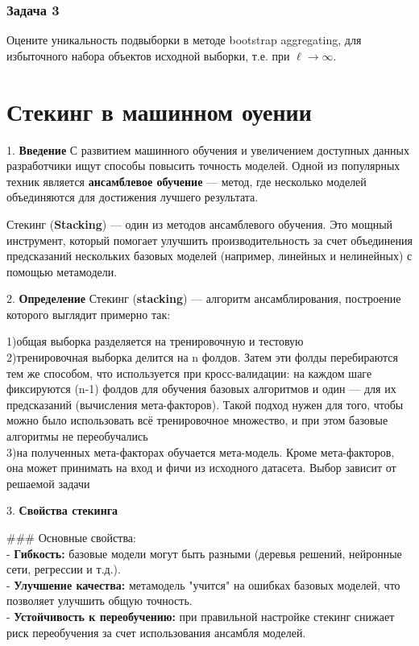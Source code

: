 \subsubsection*{Задача 3}
Оцените уникальность подвыборки в методе bootstrap aggregating, для избыточного набора объектов исходной выборки, т.е. при $\ell \to \infty$.



\section{Стекинг в машинном оуении}


1. \textbf{Введение}  
С развитием машинного обучения и увеличением доступных данных разработчики ищут способы повысить точность моделей. Одной из популярных техник является \textbf{ансамблевое обучение} — метод, где несколько моделей объединяются для достижения лучшего результата.  

Стекинг (\textbf{Stacking}) — один из методов ансамблевого обучения. Это мощный инструмент, который помогает улучшить производительность за счет объединения предсказаний нескольких базовых моделей (например, линейных и нелинейных) с помощью метамодели.  

2. \textbf{Определение}  
Стекинг (\textbf{stacking}) — алгоритм ансамблирования, построение которого выглядит примерно так:

1)общая выборка разделяется на тренировочную и тестовую\\
2)тренировочная выборка делится на n фолдов. Затем эти фолды перебираются тем же способом, что используется при кросс-валидации: на каждом шаге фиксируются (n-1)  фолдов для обучения базовых алгоритмов и один — для их предсказаний (вычисления мета-факторов). Такой подход нужен для того, чтобы можно было использовать всё тренировочное множество, и при этом базовые алгоритмы не переобучались\\
3)на полученных мета-факторах обучается мета-модель. Кроме мета-факторов, она может принимать на вход и фичи из исходного датасета. Выбор зависит от решаемой задачи


3. \textbf{Свойства стекинга} 

### Основные свойства:  \\
- \textbf{Гибкость:} базовые модели могут быть разными (деревья решений, нейронные сети, регрессии и т.д.). \\ 
- \textbf{Улучшение качества:} метамодель "учится" на ошибках базовых моделей, что позволяет улучшить общую точность.  \\
- \textbf{Устойчивость к переобучению:} при правильной настройке стекинг снижает риск переобучения за счет использования ансамбля моделей.  \\


